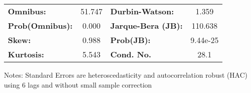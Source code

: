\begin{center}
\begin{tabular}{lcccccc}
\bottomrule
\end{tabular}
\begin{tabular}{lclc}
\textbf{Omnibus:}       & 51.747 & \textbf{  Durbin-Watson:     } &    1.359  \\
\textbf{Prob(Omnibus):} &  0.000 & \textbf{  Jarque-Bera (JB):  } &  110.638  \\
\textbf{Skew:}          &  0.988 & \textbf{  Prob(JB):          } & 9.44e-25  \\
\textbf{Kurtosis:}      &  5.543 & \textbf{  Cond. No.          } &     28.1  \\
\bottomrule
\end{tabular}
\end{center}

Notes: \newline
 [1] Standard Errors are heteroscedasticity and autocorrelation robust (HAC) using 6 lags and without small sample correction
